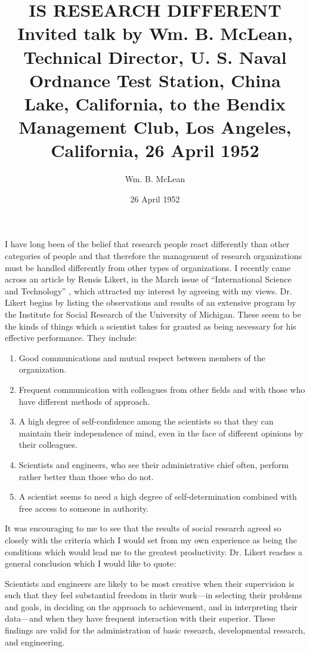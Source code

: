 \documentclass[twocolumn]{memoir}
\title{%
  IS RESEARCH DIFFERENT \\
  \small Invited talk by Wm. B. McLean, Technical Director, U. S. Naval Ordnance Test Station, China Lake, California, to the Bendix Management Club, Los Angeles, California, 26 April 1952
}
\author{Wm. B. McLean}
\date{26 April 1952}
\begin{document}
\maketitle

I have long been of the belief that research people react differently than other categories of people and that therefore the management of research organizations must be handled differently from other types of organizations. I recently came across an article by Rensis Likert, in the March issue of ``International Science and Technology'' \cite{likert}, which attracted my interest by agreeing with my views. Dr. Likert begins by listing the observations and results of an extensive program by the Institute for Social Research of the University of Michigan. These seem to be the kinds of things which a scientist takes for granted as being necessary for his effective performance. They include:

\begin{enumerate}
  \item Good communications and mutual respect between members of the organization.
  \item Frequent communication with colleagues from other fields and with those who have different methods of approach.
  \item A high degree of self-confidence among the scientists so that they can maintain their independence of mind, even in the face of different opinions by their colleagues.
  \item Scientists and engineers, who see their administrative chief often, perform rather better than those who do not. 
  \item A scientist seems to need a high degree of self-determination combined with free access to someone in authority. 
\end{enumerate}

It was encouraging to me to see that the results of social research agreed so closely with the criteria which I would set from my own experience as being the conditions which would lead me to the greatest productivity. Dr. Likert reaches a general conclusion which I would like to quote:

\begin{displayquote}
Scientists and engineers are likely to be most creative when their supervision is such that they feel substantial freedom in their work---in selecting their problems and goals, in deciding on the approach to achievement, and in interpreting their data---and when they have frequent interaction with their superior. These findings are valid for the administration of basic research, developmental research, and engineering.
\end{displayquote}
\end{document}
